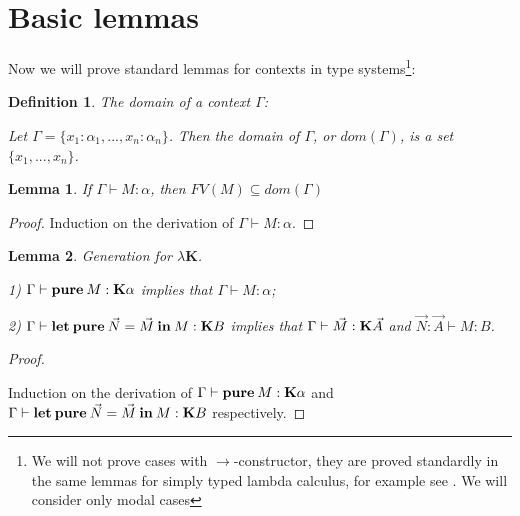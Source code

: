 \documentclass[a4paper]{article}
\newtheorem{lemma}{Lemma}
\newtheorem{defin}{Definition}
\begin{document}
  \section{Basic lemmas}

  Now we will prove standard lemmas for contexts in type systems\footnote{We will not prove cases with
  $\to$-constructor, they are proved standardly in the same lemmas for simply typed lambda calculus, for
  example see \cite{Neder}\cite{Morten}\cite{Girard}. We will consider only modal cases}:

  \begin{defin} The domain of a context $\Gamma$:

  Let $\Gamma = \{ x_1 : \alpha_1, ..., x_n : \alpha_n \}$. Then the domain of $\Gamma$, or $dom(\Gamma)$, is a set $\{  x_1, ..., x_n\}$.

  \end{defin}

  \begin{lemma}

  If $\Gamma \vdash M : \alpha$, then $FV(M) \subseteq dom(\Gamma)$

  \end{lemma}

  \begin{proof}

  Induction on the derivation of $\Gamma \vdash M : \alpha$.

  \end{proof}

  \vspace{\baselineskip}

  \begin{lemma} Generation for $\lambda \textbf{K}$.

  1) $\Gamma \vdash {\bf pure \: } M : \textbf{K}\alpha$ implies that $\Gamma \vdash M : \alpha$;

  2) $\Gamma \vdash {\bf let \: pure} \: \vec{N} = \vec{M} \: {\bf in} \: M : {\bf K} B$ implies that $\Gamma \vdash \vec{M} : {\bf K} \vec{A}$ and
$\vec{N} : \vec{A} \vdash M : B$.
  \end{lemma}

  \begin{proof}

  $ $

Induction on the derivation of $\Gamma \vdash {\bf pure \: } M : \textbf{K}\alpha$ and $\Gamma \vdash {\bf let \: pure} \: \vec{N} = \vec{M} \: {\bf in} \: M : {\bf K} B$ respectively.
  \end{proof}
\end{document}
